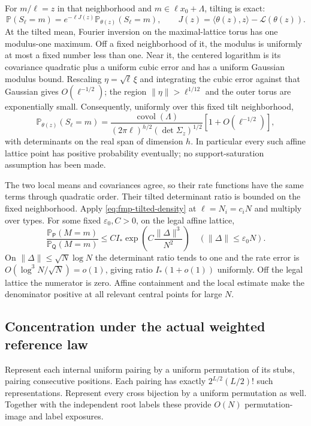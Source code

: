 For $m/\ell=z$ in that neighborhood and
$m\in\ell x_0+\Lambda$, tilting is exact:
\[
 \mathbb P(S_\ell=m)
 =e^{-\ell J(z)}\mathbb P_{\theta(z)}(S_\ell=m),\qquad
 J(z)=\langle\theta(z),z\rangle-\mathcal L(\theta(z)).
\]
At the tilted mean, Fourier inversion on the maximal-lattice torus
has one modulus-one maximum. Off a fixed neighborhood of it, the
modulus is uniformly at most a fixed number less than one. Near it,
the centered logarithm is its covariance quadratic plus a uniform
cubic error and has a uniform Gaussian modulus bound. Rescaling
$\eta=\sqrt\ell\,\xi$ and integrating the cubic error against that
Gaussian gives $O(\ell^{-1/2})$; the region
$\|\eta\|>\ell^{1/12}$ and the outer torus are exponentially small.
Consequently, uniformly over this fixed tilt neighborhood,
\begin{equation}\label{eq:fmp-tilted-density}
 \mathbb P_{\theta(z)}(S_\ell=m)=
 \frac{\operatorname{covol}(\Lambda)}
 {(2\pi\ell)^{h/2}(\det\Sigma_z)^{1/2}}
 [1+O(\ell^{-1/2})],
\end{equation}
with determinants on the real span of dimension $h$. In particular
every such affine lattice point has positive probability eventually;
no support-saturation assumption has been made.

The two local means and covariances agree, so their rate functions
have the same terms through quadratic order. Their tilted determinant
ratio is bounded on the fixed neighborhood. Apply
\eqref{eq:fmp-tilted-density} at $\ell=N_i=c_iN$ and multiply over
types. For some fixed $\varepsilon_0,C>0$, on the legal affine lattice,
\begin{equation}\label{eq:fmp-fixed-ratio}
 \frac{\mathbb P_{\mathsf P}(M=m)}{\mathbb P_{\mathsf Q}(M=m)}
 \le CI_*\exp\!\left(C\frac{\|\Delta\|^3}{N^2}\right)
 \quad(\|\Delta\|\le\varepsilon_0N).
\end{equation}
On $\|\Delta\|\le\sqrt N\log N$ the determinant ratio tends to one
and the rate error is $O(\log^3N/\sqrt N)=o(1)$, giving ratio
$I_*(1+o(1))$ uniformly. Off the legal lattice the numerator is zero.
Affine containment and the local estimate make the denominator
positive at all relevant central points for large $N$.

\subsection{Concentration under the actual weighted reference law}
Represent each internal uniform pairing by a uniform permutation of
its stubs, pairing consecutive positions. Each pairing has exactly
$2^{L/2}(L/2)!$ such representations. Represent every cross bijection
by a uniform permutation as well. Together with the independent root
labels these provide $O(N)$ permutation-image and label exposures.

